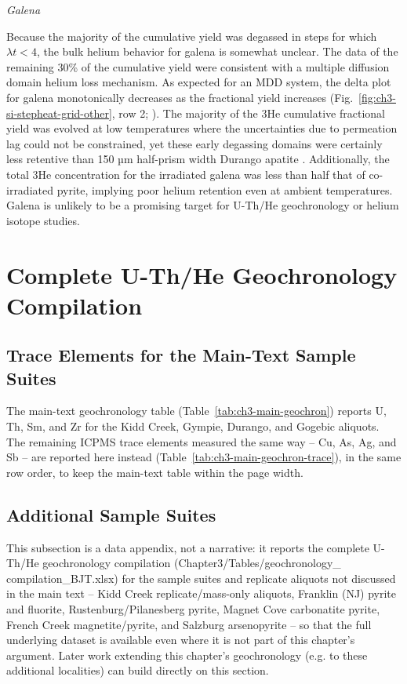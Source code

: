 \emph{Galena}

Because the majority of the cumulative yield was degassed in steps for which $\lambda t < 4$, the bulk helium behavior for galena is somewhat unclear.
The data of the remaining 30\% of the cumulative yield were consistent with a multiple diffusion domain helium loss
mechanism. As expected for an MDD system, the delta plot for galena
monotonically decreases as the fractional yield increases (Fig.~\ref{fig:ch3-si-stepheat-grid-other}, row 2; \citealp{farley2018}).
The majority of the 3He cumulative fractional yield was evolved at low temperatures where the
uncertainties due to permeation lag could not be constrained, yet these early degassing domains were certainly less retentive than 150 µm
half-prism width Durango apatite \citep{farley2000}. Additionally, the total 3He concentration for the irradiated galena was less than half that of
co-irradiated pyrite, implying poor helium retention even at ambient temperatures.
Galena is unlikely to be a promising target for U-Th/He geochronology or helium isotope studies.

\section{Complete U-Th/He Geochronology Compilation}
\label{ch3-si-geochron}

\subsection*{Trace Elements for the Main-Text Sample Suites}

The main-text geochronology table (Table~\ref{tab:ch3-main-geochron}) reports
U, Th, Sm, and Zr for the Kidd Creek, Gympie, Durango, and Gogebic aliquots.
The remaining ICPMS trace elements measured the same way -- Cu, As, Ag, and
Sb -- are reported here instead (Table~\ref{tab:ch3-main-geochron-trace}),
in the same row order, to keep the main-text table within the page width.

\ChThreeGeochronMainTraceSITable

\subsection*{Additional Sample Suites}

This subsection is a data appendix, not a narrative: it reports the complete
U-Th/He geochronology compilation (Chapter3/Tables/geochronology\_
compilation\_BJT.xlsx) for the sample suites and replicate aliquots not
discussed in the main text -- Kidd Creek replicate/mass-only aliquots,
Franklin (NJ) pyrite and fluorite, Rustenburg/Pilanesberg pyrite, Magnet
Cove carbonatite pyrite, French Creek magnetite/pyrite, and Salzburg
arsenopyrite -- so that the full underlying dataset is available even
where it is not part of this chapter's argument. Later work extending
this chapter's geochronology (e.g. to these additional localities) can
build directly on this section.


